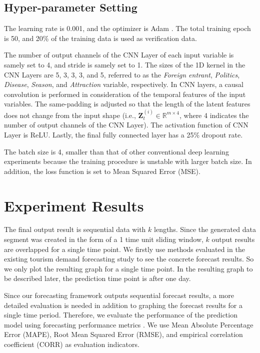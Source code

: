\documentclass[conference]{IEEEtran}
\begin{document}
\subsection{Hyper-parameter Setting} \label{HPS}
The learning rate is 0.001, and the optimizer is Adam \cite{kingma2014adam}. The total training epoch is 50, and 20\% of the training data is used as verification data.

The number of output channels of the CNN Layer of each input variable is samely set to 4, and stride is samely set to 1. The sizes of the 1D kernel in the CNN Layers are 5, 3, 3, 3, and 5, referred to as the \textit{Foreign entrant}, \textit{Politics}, \textit{Disease}, \textit{Season}, and \textit{Attraction} variable, respectively. In CNN layers, a causal convolution is performed in consideration of the temporal features of the input variables. The same-padding is adjusted so that the length of the latent features does not change from the input shape (i.e., \(\mathbf{Z}_t^{(i)} \in \mathbb{R}^{m \times 4}\), where 4 indicates the number of output channels of the CNN Layer). The activation function of CNN Layer is ReLU. Lastly, the final fully connected layer has a 25\% dropout rate.


The batch size is 4, smaller than that of other conventional deep learning experiments because the training procedure is unstable with larger batch size. In addition, the loss function is set to Mean Squared Error (MSE).

\section{Experiment Results}
The final output result is sequential data with \(k\) lengths. Since the generated data segment was created in the form of a 1 time unit sliding window, \(k\) output results are overlapped for a single time point. We firstly use methods evaluated in the existing tourism demand forecasting study to see the concrete forecast results. So we only plot the resulting graph for a single time point. In the resulting graph to be described later, the prediction time point is after one day.

Since our forecasting framework outputs sequential forecast results, a more detailed evaluation is needed in addition to graphing the forecast results for a single time period. Therefore, we evaluate the performance of the prediction model using forecasting performance metrics \cite{shih2019temporal}. We use Mean Absolute Percentage Error (MAPE), Root Mean Squared Error (RMSE), and empirical correlation coefficient (CORR) as evaluation indicators.
\end{document}
